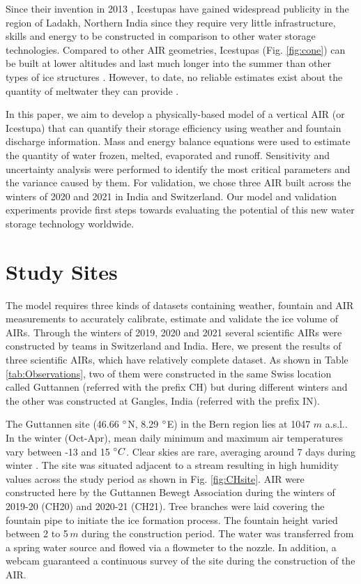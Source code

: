 \documentclass[utf8]{frontiersSCNS} %
\begin{document}
Since their invention in 2013 \citep{campaign}, Icestupas have gained widespread publicity in the region of Ladakh,
Northern India since they require very little infrastructure, skills and energy to be constructed in comparison to other
water storage technologies. Compared to other AIR geometries, Icestupas (Fig. \ref{fig:cone}) can be built at lower
altitudes and last much longer into the summer than other types of ice structures \citep{campaign}. However, to date, no
reliable estimates exist about the quantity of meltwater they can provide \citep{Nusser_2018}.

In this paper, we aim to develop a physically-based model of a vertical AIR (or Icestupa) that can quantify their
storage efficiency using weather and fountain discharge information. Mass and energy balance equations were used to
estimate the quantity of water frozen, melted, evaporated and runoff. Sensitivity and uncertainty analysis were
performed to identify the most critical parameters and the variance caused by them. For validation, we chose three AIR
built across the winters of 2020 and 2021 in India and Switzerland. Our model and validation experiments provide first
steps towards evaluating the potential of this new water storage technology worldwide.

\section{Study Sites}
The model requires three kinds of datasets containing weather, fountain and AIR measurements to accurately calibrate,
estimate and validate the ice volume of AIRs. Through the winters of 2019, 2020 and 2021 several scientific AIRs were
constructed by teams in Switzerland and India. Here, we present the results of three scientific AIRs, which have
relatively complete dataset. As shown in Table \ref{tab:Observations}, two of them were constructed in the same Swiss
location called Guttannen (referred with the prefix CH) but during different winters and the other was constructed at
Gangles, India (referred with the prefix IN).

The Guttannen site (46.66 $\degree$N, 8.29 $\degree$E) in the Bern region lies at 1047 $m$ a.s.l.. In the winter
(Oct-Apr), mean daily minimum and maximum air temperatures vary between -13 and 15 $\degree C$. Clear skies are rare,
averaging around 7 days during winter \citep{eispalast}. The site was situated adjacent to a stream resulting in high
humidity values across the study period as shown in Fig. \ref{fig:CHsite}. AIR were constructed here by the Guttannen
Bewegt Association during the winters of 2019-20 (CH20) and 2020-21 (CH21). Tree branches were laid covering the
fountain pipe to initiate the ice formation process. The fountain height varied between 2 to 5\,$m$ during the
construction period. The water was transferred from a spring water source and flowed via a flowmeter to the nozzle. In
addition, a webcam guaranteed a continuous survey of the site during the construction of the AIR.
\end{document}
